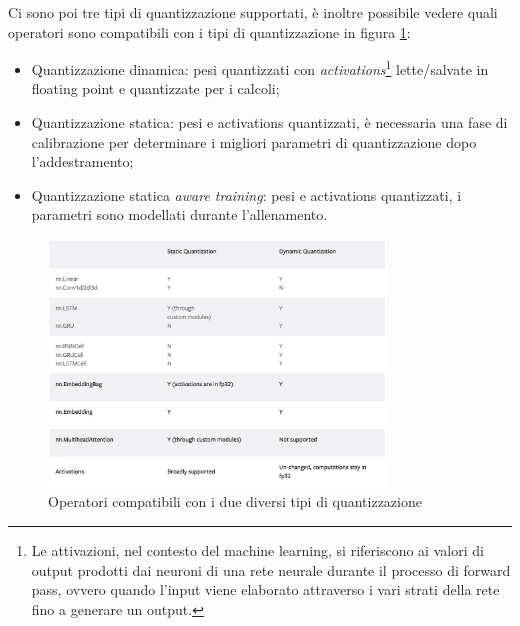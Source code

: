 Ci sono poi tre tipi di quantizzazione supportati, è inoltre possibile vedere quali operatori sono compatibili con i tipi di quantizzazione in figura \ref{fig:quantizationCoverage}:
\begin{itemize}
    \item Quantizzazione dinamica: pesi quantizzati con \textit{activations}\footnote{Le attivazioni, nel contesto del machine learning,
    si riferiscono ai valori di output prodotti dai neuroni di una rete neurale durante il processo di forward pass, ovvero quando l'input viene
    elaborato attraverso i vari strati della rete fino a generare un output.} lette/salvate in floating point e quantizzate per i calcoli;
    \item Quantizzazione statica: pesi e activations quantizzati, è necessaria una fase di calibrazione per determinare i migliori parametri di quantizzazione dopo l'addestramento;
    \item Quantizzazione statica \textit{aware training}: pesi e activations quantizzati, i parametri sono modellati durante l'allenamento.
\end{itemize}

\begin{figure}[ht]
    \centering
    \includegraphics[width=0.8\textwidth]{Immagini/operator coverage.png}
    \caption{Operatori compatibili con i due diversi tipi di quantizzazione}
    \label{fig:quantizationCoverage}
\end{figure}
    
